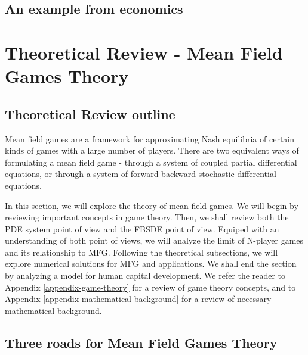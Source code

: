 \documentclass{article}
\begin{document}
\fi

\subsection{An example from economics}


\section{Theoretical Review - Mean Field Games Theory}

\subsection{Theoretical Review outline}

Mean field games are a framework for approximating Nash equilibria of certain kinds of games with a large number of players.
There are two equivalent ways of formulating a mean field game - through a system of coupled partial differential equations, or through a system of forward-backward stochastic differential equations.

In this section, we will explore the theory of mean field games.
We will begin by reviewing important concepts in game theory. 
Then, we shall review both the PDE system point of view and the FBSDE point of view. 
Equiped with an understanding of both point of views, we will analyze the limit of N-player games and its relationship to MFG.
Following the theoretical subsections, we will explore numerical solutions for MFG and applications.
We shall end the section by analyzing a model for human capital development.
We refer the reader to Appendix \ref{appendix-game-theory} for a review of game theory concepts, and to Appendix \ref{appendix-mathematical-background} for a review of necessary mathematical background.


\subsection{Three roads for Mean Field Games Theory}
\end{document}
